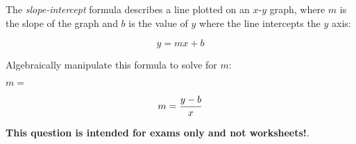 

The {\it slope-intercept} formula describes a line plotted on an $x$-$y$ graph, where $m$ is the slope of the graph and $b$ is the value of $y$ where the line intercepts the $y$ axis:

$$y = mx + b$$

Algebraically manipulate this formula to solve for $m$:

\vskip 20pt

$m = $







$$m = {y - b \over x}$$







{\bf This question is intended for exams only and not worksheets!}.



